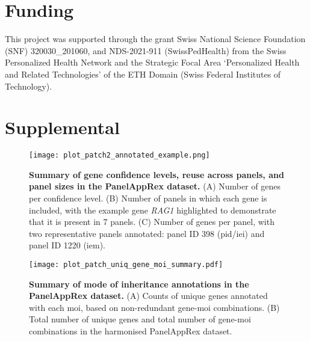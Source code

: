 \section*{Funding}
\noindent This project was supported through the grant Swiss National Science Foundation  (SNF) 320030\_201060, and NDS-2021-911 (SwissPedHealth) from the Swiss Personalized Health Network and the Strategic Focal Area `Personalized Health and Related Technologies' of the ETH Domain (Swiss Federal Institutes of Technology).



\clearpage

\beginsupplement
\section{Supplemental} \label{Supplemental_text}

\begin{figure}[ht]
    \centering
    \texttt{[image: plot\_patch2\_annotated\_example.png]}    
\caption{\textbf{Summary of gene confidence levels, reuse across panels, and panel sizes in the PanelAppRex dataset.}
(A) Number of genes per confidence level. 
(B) Number of panels in which each gene is included, with the example gene \textit{RAG1} highlighted to demonstrate that it is present in 7 panels. 
(C) Number of genes per panel, with two representative panels annotated: panel ID 398 (\ac{pid}/\ac{iei}) and panel ID 1220 (\ac{iem}).
}
    \label{fig:summary_stats}
\end{figure}


\begin{figure}[ht]
    \centering
    \texttt{[image: plot\_patch\_uniq\_gene\_moi\_summary.pdf]}
\caption{\textbf{Summary of mode of inheritance annotations in the PanelAppRex dataset.}
(A) Counts of unique genes annotated with each \ac{moi}, based on non-redundant gene-\ac{moi} combinations.
(B) Total number of unique genes and total number of gene-\ac{moi} combinations in the harmonised PanelAppRex dataset.
}
    \label{fig:uniq_gene_moi}
\end{figure}

